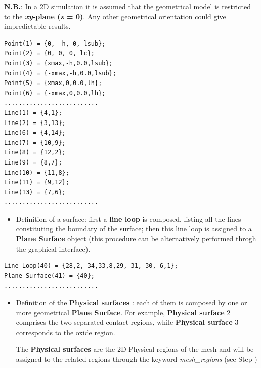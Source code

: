  \textbf{N.B.}: In a 2D simulation it is  assumed that the geometrical model is  restricted to  the  \textbf{\textit{xy}-plane (z = 0)}. Any  other geometrical orientation  could  give impredictable results. 

\begin{verbatim}
Point(1) = {0, -h, 0, lsub};
Point(2) = {0, 0, 0, lc};
Point(3) = {xmax,-h,0.0,lsub};
Point(4) = {-xmax,-h,0.0,lsub};
Point(5) = {xmax,0,0.0,lh};
Point(6) = {-xmax,0,0.0,lh};
..........................
Line(1) = {4,1};
Line(2) = {3,13};
Line(6) = {4,14};
Line(7) = {10,9};
Line(8) = {12,2};
Line(9) = {8,7};
Line(10) = {11,8};
Line(11) = {9,12};
Line(13) = {7,6};
..........................
\end{verbatim}



\begin{itemize}
\item 
Definition of a surface: first a \textbf{line loop} is composed, listing all the  lines constituting the  boundary of the surface; then this  line  loop is  assigned to a  \textbf{Plane Surface} object (this  procedure can be alternatively performed throgh the  graphical interface).                  \end{itemize}          

\begin{verbatim}
Line Loop(40) = {28,2,-34,33,8,29,-31,-30,-6,1};
Plane Surface(41) = {40};
..........................
\end{verbatim}

                                                                                                                                                                                                                   

\begin{itemize}
\item 
Definition of  the \textbf{Physical surfaces} : each of them is composed by one or more geometrical \textbf{Plane Surface}. For example, \textbf{Physical surface} 2 comprises the two separated contact regions, while \textbf{Physical surface} 3 corresponds to the  oxide  region.

The  \textbf{Physical surfaces} are the 2D Physical regions of  the  mesh and will  be  assigned to the related \TiberCAD{} regions through the keyword \textit{mesh\_regions}  (see   Step  )                                                                                                                   \end{itemize}    

